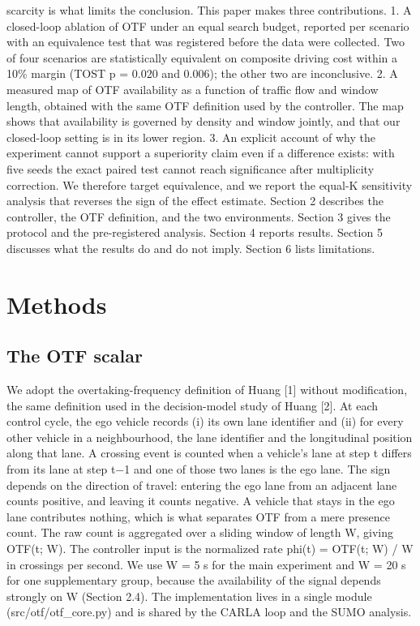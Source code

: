 \documentclass[journal]{IEEEtran}
\begin{document}
scarcity is what limits the conclusion.
This paper makes three contributions.
1. A closed-loop ablation of OTF under an equal search budget, reported per scenario with an
   equivalence test that was registered before the data were collected. Two of four scenarios are
   statistically equivalent on composite driving cost within a 10\% margin (TOST p = 0.020 and 0.006);
   the other two are inconclusive.
2. A measured map of OTF availability as a function of traffic flow and window length, obtained with
   the same OTF definition used by the controller. The map shows that availability is governed by
   density and window jointly, and that our closed-loop setting is in its lower region.
3. An explicit account of why the experiment cannot support a superiority claim even if a difference exists:
   with five seeds the exact paired test cannot reach significance after multiplicity correction. We
   therefore target equivalence, and we report the equal-K sensitivity analysis that reverses the sign
   of the effect estimate.
Section 2 describes the controller, the OTF definition, and the two environments. Section 3 gives the
protocol and the pre-registered analysis. Section 4 reports results. Section 5 discusses what the
results do and do not imply. Section 6 lists limitations.
\section*{Methods}
\subsection{The OTF scalar}
We adopt the overtaking-frequency definition of Huang [1] without modification, the same definition used in the decision-model study of Huang [2]. At each control
cycle, the ego vehicle records (i) its own lane identifier and (ii) for every other vehicle in a
neighbourhood, the lane identifier and the longitudinal position along that lane. A crossing event is
counted when a vehicle's lane at step t differs from its lane at step t$-$1 and one of those two lanes
is the ego lane. The sign depends on the direction of travel: entering the ego lane from an adjacent
lane counts positive, and leaving it counts negative. A vehicle that stays in the ego lane contributes
nothing, which is what separates OTF from a mere presence count.
The raw count is aggregated over a sliding window of length W, giving OTF(t; W). The controller input
is the normalized rate
    phi(t) = OTF(t; W) / W
in crossings per second. We use W = 5 s for the main experiment and W = 20 s for one supplementary
group, because the availability of the signal depends strongly on W (Section 2.4). The implementation
lives in a single module (src/otf/otf\_core.py) and is shared by the CARLA loop and the SUMO analysis.
\end{document}

